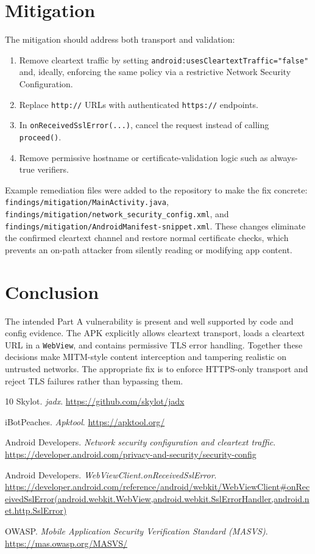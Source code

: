 \documentclass[letterpaper,twocolumn,10pt]{article}
\begin{document}
\section{Mitigation}
The mitigation should address both transport and validation:

\begin{enumerate}
\item Remove cleartext traffic by setting \texttt{android:usesCleartextTraffic="false"} and, ideally, enforcing the same policy via a restrictive Network Security Configuration.
\item Replace \texttt{http://} URLs with authenticated \texttt{https://} endpoints.
\item In \texttt{onReceivedSslError(...)}, cancel the request instead of calling \texttt{proceed()}.
\item Remove permissive hostname or certificate-validation logic such as always-true verifiers.
\end{enumerate}

Example remediation files were added to the repository to make the fix concrete: \texttt{findings/mitigation/MainActivity.java}, \texttt{findings/mitigation/network\_security\_config.xml}, and \texttt{findings/mitigation/AndroidManifest-snippet.xml}. These changes eliminate the confirmed cleartext channel and restore normal certificate checks, which prevents an on-path attacker from silently reading or modifying app content.

\section{Conclusion}
The intended Part A vulnerability is present and well supported by code and config evidence. The APK explicitly allows cleartext transport, loads a cleartext URL in a \texttt{WebView}, and contains permissive TLS error handling. Together these decisions make MITM-style content interception and tampering realistic on untrusted networks. The appropriate fix is to enforce HTTPS-only transport and reject TLS failures rather than bypassing them.

\begin{thebibliography}{10}
\small
{}
Skylot. \textit{jadx}. \url{https://github.com/skylot/jadx}

iBotPeaches. \textit{Apktool}. \url{https://apktool.org/}

Android Developers. \textit{Network security configuration and cleartext traffic}. \url{https://developer.android.com/privacy-and-security/security-config}

Android Developers. \textit{WebViewClient.onReceivedSslError}. \url{https://developer.android.com/reference/android/webkit/WebViewClient#onReceivedSslError(android.webkit.WebView,android.webkit.SslErrorHandler,android.net.http.SslError)}

OWASP. \textit{Mobile Application Security Verification Standard (MASVS)}. \url{https://mas.owasp.org/MASVS/}
\end{thebibliography}
\end{document}
